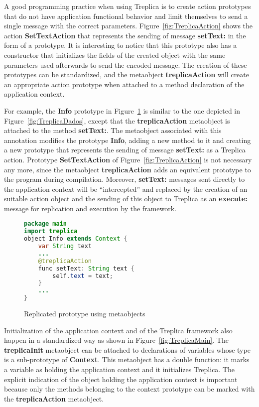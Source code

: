 \documentclass[preprint,review]{elsarticle}
\newcommand{\srcstyle}[1]{\ttfamily\textbf{#1}\rmfamily}
\begin{document}
A good  programming practice when  using Treplica is to  create action
prototypes that do not have  application functional behavior and limit
themselves  to send  a  single message  with  the correct  parameters.
Figure~\ref{fig:TreplicaAction}        shows         the        action
\srcstyle{SetTextAction}  that  represents   the  sending  of  message
\srcstyle{setText:} in the  form of a prototype. It  is interesting to
notice that this prototype also has a constructor that initializes the
fields of the created object  with the same parameters used afterwards
to send the  encoded message. The creation of these  prototypes can be
standardized, and the metaobject \srcstyle{treplicaAction} will create
an appropriate action prototype when  attached to a method declaration
of the application context.

For      example,      the      \srcstyle{Info}      prototype      in
Figure~\ref{fig:TreplicaDadosMeta} is  similar to the one  depicted in
Figure~\ref{fig:TreplicaDados},         except        that         the
\srcstyle{treplicaAction}  metaobject   is  attached  to   the  method
\srcstyle{setText:}.  The  metaobject associated with  this annotation
modifies the prototype \srcstyle{Info}, adding  a new method to it and
creating  a  new prototype  that  represents  the sending  of  message
\srcstyle{setText:}     as    a     Treplica    action.      Prototype
\srcstyle{SetTextAction}  of  Figure~\ref{fig:TreplicaAction}  is  not
necessary  any more,  since  the metaobject  \srcstyle{treplicaAction}
adds  an  equivalent  prototype  to the  program  during  compilation.
Moreover,   \srcstyle{setText:}   messages   sent  directly   to   the
application  context  will  be  ``intercepted'' and  replaced  by  the
creation of an  suitable action object and the sending  of this object
to  Treplica  as an  \srcstyle{execute:}  message  for replication  and
execution by the framework.

\begin{figure}[h]
\centering
\begin{lstlisting}[language=Java]
package main
import treplica
object Info extends Context {
    var String text
    ...
    @treplicaAction
    func setText: String text {
        self.text = text;
    }
    ...
}
\end{lstlisting}
\caption{Replicated prototype using metaobjects}
\label{fig:TreplicaDadosMeta}
\end{figure}

Initialization  of  the  application   context  and  of  the  Treplica
framework   also  happen   in   a  standardized   way   as  shown   in
Figure~\ref{fig:TreplicaMain}.  The \srcstyle{treplicaInit} metaobject
can  be  attached  to  declarations  of  variables  whose  type  is  a
sub-prototype  of \srcstyle{Context}.   This metaobject  has a  double
function: it marks  a variable as holding the  application context and
it  initializes  Treplica.   The  explicit indication  of  the  object
holding the application context is  important because only the methods
belonging  to   the  context   prototype  can   be  marked   with  the
\srcstyle{treplicaAction} metaobject.
\end{document}
